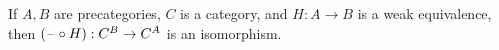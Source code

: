 \documentclass[hott-all.tex]{subfiles}
\begin{document}
\begin{thm}\label{ct:cat-weq-eq}
  If $A,B$ are precategories, $C$ is a category, and $H:A\to B$ is a weak equivalence, then $(\mathord{\hspace{1pt}\text{--}\hspace{1pt}}\circ H):C^B \to C^A$ is an isomorphism.
\end{thm}
%
%
%
\end{document}
